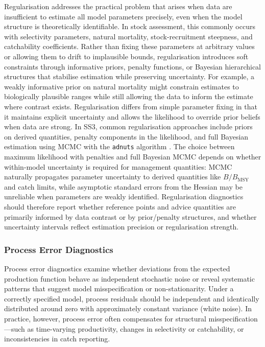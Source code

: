 \documentclass[11pt,a4paper]{article}
\begin{document}
Regularisation addresses the practical problem that arises when data are insufficient to estimate all model parameters precisely, even when the model structure is theoretically identifiable. In stock assessment, this commonly occurs with selectivity parameters, natural mortality, stock-recruitment steepness, and catchability coefficients. Rather than fixing these parameters at arbitrary values or allowing them to drift to implausible bounds, regularisation introduces soft constraints through informative priors, penalty functions, or Bayesian hierarchical structures that stabilise estimation while preserving uncertainty. For example, a weakly informative prior on natural mortality might constrain estimates to biologically plausible ranges while still allowing the data to inform the estimate where contrast exists. Regularisation differs from simple parameter fixing in that it maintains explicit uncertainty and allows the likelihood to override prior beliefs when data are strong. In SS3, common regularisation approaches include priors on derived quantities, penalty components in the likelihood, and full Bayesian estimation using MCMC with the \texttt{adnuts} algorithm \citep{courtney2024adnuts}. The choice between maximum likelihood with penalties and full Bayesian MCMC depends on whether within-model uncertainty is required for management quantities: MCMC naturally propagates parameter uncertainty to derived quantities like $B/B_{\text{MSY}}$ and catch limits, while asymptotic standard errors from the Hessian may be unreliable when parameters are weakly identified. Regularisation diagnostics should therefore report whether reference points and advice quantities are primarily informed by data contrast or by prior/penalty structures, and whether uncertainty intervals reflect estimation precision or regularisation strength.

\subsubsection{Process Error Diagnostics}

Process error diagnostics examine whether deviations from the expected production function behave as independent stochastic noise or reveal systematic patterns that suggest model misspecification or non-stationarity. Under a correctly specified model, process residuals should be independent and identically distributed around zero with approximately constant variance (white noise). In practice, however, process error often compensates for structural misspecification---such as time-varying productivity, changes in selectivity or catchability, or inconsistencies in catch reporting.
\end{document}
